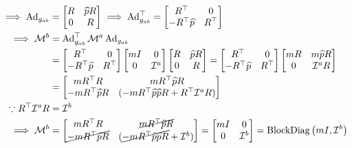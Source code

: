 \begin{align*}
    \implies
    \operatorname{Ad}_{g_{a b}}
     & =
    \begin{bmatrix}
        R & \widehat{p} R \\
        0 & R
    \end{bmatrix}
    \implies
    \operatorname{Ad}_{g_{a b}}^{\top}
    =
    \begin{bmatrix}
        R^{\top}              & 0        \\
        - R^{\top}\widehat{p} & R^{\top}
    \end{bmatrix}
    \\
    \implies
    \mathcal{M}^{b}
     & =
    \operatorname{Ad}_{g_{a b}}^{\top} \mathcal{M}^{a} \operatorname{Ad}_{g_{a b}}
    \\ & =
    \begin{bmatrix}
        R^{\top}              & 0        \\
        - R^{\top}\widehat{p} & R^{\top}
    \end{bmatrix}
    \begin{bmatrix}
        mI & 0               \\
        0  & \mathcal{I}^{a}
    \end{bmatrix}
    \begin{bmatrix}
        R & \widehat{p} R \\
        0 & R
    \end{bmatrix}
    =
    \begin{bmatrix}
        R^{\top}               & 0        \\
        - R^{\top} \widehat{p} & R^{\top}
    \end{bmatrix}
    \begin{bmatrix}
        m R & m \widehat{p} R   \\
        0   & \mathcal{I}^{a} R
    \end{bmatrix}
    \\ & =
    \begin{bmatrix}
        m R^{\top} R              & mR^{\top} \widehat{p} R                                              \\
        -m R^{\top} \widehat{p} R & (-m R^{\top} \widehat{p} \widehat{p} R + R^{\top} \mathcal{I}^{a} R)
    \end{bmatrix}
    \\
    \because
    R^{\top} \mathcal{I}^{a} R
     & =
    \mathcal{I}^{b}
    \\
    \implies
    \mathcal{M}^{b}
     & =
    \begin{bmatrix}
        m R^{\top} R                       & \cancel{mR^{\top} \widehat{p} R}                                   \\
        \cancel{-m R^{\top} \widehat{p} R} & (\cancel{-m R^{\top} \widehat{p} \widehat{p} R} + \mathcal{I}^{b})
    \end{bmatrix}
    =
    \begin{bmatrix}
        mI & 0               \\
        0  & \mathcal{I}^{b}
    \end{bmatrix}
    =
    \operatorname{BlockDiag}\left(m I, \mathcal{I}^{b}\right)
\end{align*}
